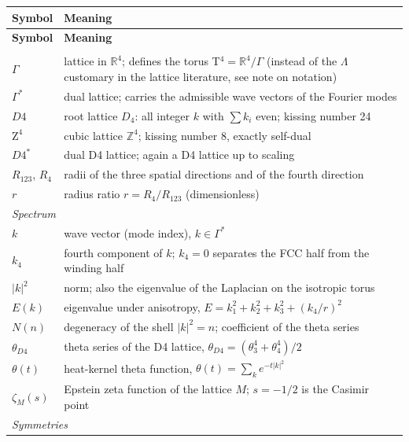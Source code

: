 \begin{center}
\renewcommand{\arraystretch}{1.3}
{\small\setlength\tabcolsep{5pt}
\begin{longtable}{lp{9.6cm}}
\toprule
\textbf{Symbol} & \textbf{Meaning} \\
\midrule
\endfirsthead
\toprule
\textbf{Symbol} & \textbf{Meaning} \\
\midrule
\endhead
\bottomrule
\endfoot
\multicolumn{2}{l}{\textit{Lattice and torus}} \\
$\Gamma$ & lattice in $\mathbb{R}^4$; defines the torus
  T$^4 = \mathbb{R}^4/\Gamma$ (instead of the $\Lambda$ customary
  in the lattice literature, see note on notation) \\
$\Gamma^{*}$ & dual lattice; carries the admissible wave vectors
  of the Fourier modes \\
$D4$ & root lattice $D_4$: all integer $k$ with $\sum k_i$ even;
  kissing number 24 \\
$\text{Z}^4$ & cubic lattice $\mathbb{Z}^4$; kissing number 8,
  exactly self-dual \\
$D4^{*}$ & dual D4 lattice; again a D4 lattice up to scaling \\
$R_{123}$, $R_4$ & radii of the three spatial directions and of the
  fourth direction \\
$r$ & radius ratio $r = R_4/R_{123}$ (dimensionless) \\
\midrule
\multicolumn{2}{l}{\textit{Spectrum}} \\
$k$ & wave vector (mode index), $k \in \Gamma^{*}$ \\
$k_4$ & fourth component of $k$; $k_4 = 0$ separates the FCC half
  from the winding half \\
$|k|^2$ & norm; also the eigenvalue of the Laplacian on the
  isotropic torus \\
$E(k)$ & eigenvalue under anisotropy,
  $E = k_1^2+k_2^2+k_3^2+(k_4/r)^2$ \\
$N(n)$ & degeneracy of the shell $|k|^2 = n$; coefficient of the
  theta series \\
$\theta_{D4}$ & theta series of the D4 lattice,
  $\theta_{D4} = (\theta_3^4+\theta_4^4)/2$ \\
$\theta(t)$ & heat-kernel theta function,
  $\theta(t) = \sum_k e^{-t|k|^2}$ \\
$\zeta_M(s)$ & Epstein zeta function of the lattice $M$;
  $s = -1/2$ is the Casimir point \\
\midrule
\multicolumn{2}{l}{\textit{Symmetries}} \\

\end{longtable}}
\end{center}
